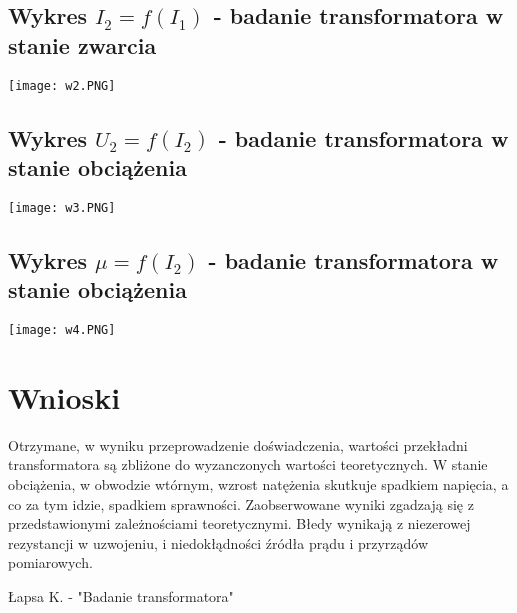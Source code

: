 \documentclass[polish,a4paper]{article}
\begin{document}
\subsection{Wykres $I_2 = f(I_1)$ - badanie transformatora w stanie zwarcia}
\texttt{[image: w2.PNG]}
\subsection{Wykres $U_2 = f(I_2)$ - badanie transformatora w stanie obciążenia}
\texttt{[image: w3.PNG]}
\subsection{Wykres $\mu = f(I_2)$ - badanie transformatora w stanie obciążenia}
\texttt{[image: w4.PNG]}
\section{Wnioski}
Otrzymane, w wyniku przeprowadzenie doświadczenia, wartości przekładni transformatora są zbliżone do wyzanczonych wartości teoretycznych. \newline
W stanie obciążenia, w obwodzie wtórnym, wzrost natężenia skutkuje spadkiem napięcia, a co za tym idzie, spadkiem sprawności.\newline
Zaobserwowane wyniki zgadzają się z przedstawionymi zależnościami teoretycznymi. \newline
Błedy wynikają z niezerowej rezystancji w uzwojeniu, i niedokłądności źródła prądu i przyrządów pomiarowych.

\begin{thebibliography}{1}
 Łapsa K. - "Badanie transformatora"
\end{thebibliography}
\end{document}
